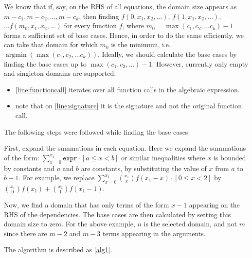 \documentclass{article}
\DeclareMathOperator*{\argmin}{argmin}
\newcommand{\expr}{\mathtt{expr}}
\begin{document}
We know that if, say, on the RHS of all equations, the domain size appears as
$m - c_1, m - c_2, \dots, m - c_k$, then finding $f(0, x_1, x_2, \dots)$,
$f(1, x_1, x_2, \dots)$, $\dots f(m_0, x_1, x_2, \dots)$ for every function $f$,
where $m_0 = \max(c_1, c_2, \dots c_k) - 1$ forms a sufficient set of base
cases. Hence, in order to do the same efficiently, we can take that domain for
which $m_0$ is the minimum, i.e. $\argmin(\max(c_1, c_2, \dots c_k))$. Ideally,
we should calculate the base cases by finding the base cases up to
$\max(c_{1}, c_{2}, \dots) - 1$. However, currently only empty and singleton
domains are supported.

\begin{itemize}
  \item \cref{line:functioncall} iterates over all function calls in the
        algebraic expression.
  \item note that on \cref{line:signature} it is the signature and not the
        original function call.
\end{itemize}


The following steps were followed while finding the base cases:

First, expand the summations in each equation. Here we expand the summations of
the form: $\sum_{x=0}^{x_{1}} \expr{} \cdot [a \le x < b]$ or similar
inequalities where $x$ is bounded by constants and $a$ and $b$ are constants, by
substituting the value of $x$ from $a$ to $b-1$. For example, we replace
$\sum_{x=0}^{x_1} \binom{x_{1}}{x} f(x_1 - x) \cdot [0 \le x < 2]$ by
$\binom{x_{1}}{0} f(x_1) + \binom{x_{1}}{1} f(x_1-1)$.

Now, we find a domain that has only terms of the form $x-1$ appearing on the RHS
of the dependencies. The base cases are then calculated by setting this domain
size to zero. For the above example, $n$ is the selected domain, and not $m$
since there are $m-2$ and $m-3$ terms appearing in the arguments.

The algorithm is described as \cref{alg1}.
\end{document}
